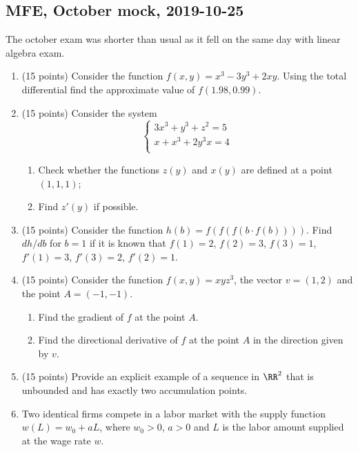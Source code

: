 
\subsection{MFE, October mock, 2019-10-25}

The october exam was shorter than usual as it fell on the same day with linear algebra exam. 

\begin{enumerate}
    \item (15 points) Consider the function $f(x, y) = x^3 -3 y^3 + 2xy$.
    Using the total differential find the approximate value of $f(1.98, 0.99)$.
  

    \item (15 points) Consider the system
    \[
    \begin{cases}
    3x^3 + y^3 + z^2 = 5 \\
    x + x^3 + 2y^3x = 4 \\
    \end{cases}
    \]
  
    \begin{enumerate}
      \item Check whether the functions $z(y)$ and $x(y)$ are defined at a point $(1, 1, 1)$;
      \item Find $z'(y)$ if possible.
   \end{enumerate}
  

   \item (15 points) Consider the function $h(b) = f(f(f(b \cdot f(b))))$.
   Find $dh/db$ for $b=1$ if it is known that $f(1)=2$, $f(2)=3$, $f(3)=1$, 
   $f'(1)=3$, $f'(3)=2$, $f'(2)=1$.
  

  \item (15 points) Consider the function $f (x, y) = xyz^3$, the vector $v = (1, 2)$ and the point $A = (−1, −1)$.
  
  \begin{enumerate}
    \item  Find the gradient of $f$ at the point $A$.
  \item  Find the directional derivative of $f$ at the point $A$ in the direction given by $v$.
  \end{enumerate}
  
  \item (15 points) Provide an explicit example of a sequence in $\RR^2$ that is unbounded and has 
  exactly two accumulation points. 
  
  
  \item Two identical firms compete in a labor market with the supply function $w(L)= w_0 + aL$, 
  where $w_0>0$, $a>0$ and $L$ is the labor amount supplied at the wage rate $w$.
  

\end{enumerate}
